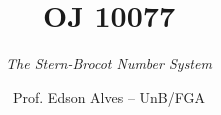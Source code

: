 \title{OJ 10077}
\subtitle{\textit{The Stern-Brocot Number System}}
\author{Prof. Edson Alves -- UnB/FGA}
\date{}
